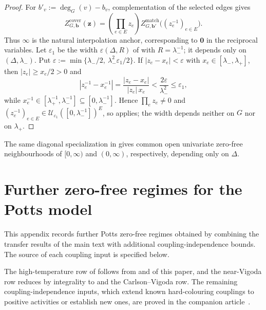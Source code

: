 \documentclass[11pt,reqno]{article}
\theoremstyle{plain}
\theoremstyle{definition}
\theoremstyle{remark}
\theoremstyle{definition}
\theoremstyle{remark}
\newcommand{\eps}{\varepsilon}
\newcommand{\Deg}{\Delta}                        %
\begin{document}
\begin{proof}
For \(b'_v:=\deg_G(v)-b_v\), complementation of the selected edges gives
\[
  Z^{\mathrm{cover}}_{G,\mathbf b}(\mathbf z)
  =\left(\prod_{e\in E}z_e\right)
    Z^{\mathrm{match}}_{G,\mathbf b'}
       \bigl((z_e^{-1})_{e\in E}\bigr).
\]
Thus \(\boldsymbol\infty\) is the natural interpolation anchor, corresponding
to \(\mathbf0\) in the reciprocal variables.
Let \(\eps_1\) be the width \(\eps(\Deg,R)\) of
 with \(R=\lambda_-^{-1}\); it depends only on
\((\Deg,\lambda_-)\).  Put
\(\eps:=\min\{\lambda_-/2,\ \lambda_-^2\eps_1/2\}\).  If
\(|z_e-x_e|<\eps\) with \(x_e\in[\lambda_-,\lambda_+]\), then
\(|z_e|\ge x_e/2>0\) and
\[
  |z_e^{-1}-x_e^{-1}|=\frac{|z_e-x_e|}{|z_e|\,x_e}
  <\frac{2\eps}{\lambda_-^2}\le\eps_1,
\]
while \(x_e^{-1}\in[\lambda_+^{-1},\lambda_-^{-1}]\subseteq
[0,\lambda_-^{-1}]\).  Hence \(\prod_ez_e\ne0\) and
\((z_e^{-1})_{e\in E}\in\mathcal U_{\eps_1}([0,\lambda_-^{-1}])^E\), so
 applies; the width depends neither on \(G\)
nor on \(\lambda_+\).
\end{proof}

The same diagonal specialization in
 gives common open univariate
zero-free neighbourhoods of \([0,\infty)\) and \((0,\infty)\), respectively,
depending only on \(\Deg\).

\clearpage
\appendix
{}
\renewcommand*{\theHequation}{\theHsection.\arabic{equation}}

\section{Further zero-free regimes for the Potts model}
\label{app:additional-potts}

This appendix records further Potts zero-free regimes obtained by
combining the transfer results of the main text with additional
coupling-independence bounds.  The source of each coupling input is
specified below.

The high-temperature row of  follows from
 and
 of this paper, and the near-Vigoda row
reduces by integrality to  and the Carlson--Vigoda
row.  The remaining coupling-independence inputs, which extend known
hard-colouring couplings to positive activities or establish new ones,
are proved in the companion article~\cite{ShaoShi2026FurtherPotts}.
\end{document}
